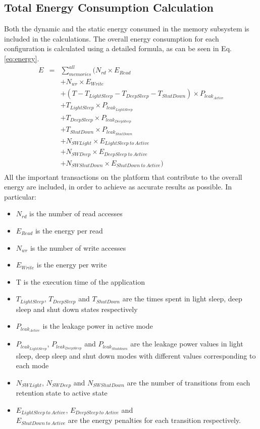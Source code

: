 \documentclass[smallcondensed]{svjour3}
\begin{document}
\subsection{Total Energy Consumption Calculation}
Both the dynamic and the static energy consumed in the memory subsystem is included in the calculations.
The overall energy consumption for each configuration is calculated using a detailed formula, as can be seen in Eq.\ref{eq:energy}. 
\setlength{\arraycolsep}{0.0em}
\begin{eqnarray}
\label{eq:energy}
 E &{}= {}&\sum\limits_{memories}^{all}  ( N_{rd} \times E_{Read} \nonumber\\
		&&+ N_{wr} \times E_{Write} \nonumber\\
		&&+ (T - T_{LightSleep} - T_{DeepSleep} - T_{ShutDown}) \times P_{leak_{Active}} \nonumber\\
		&&+ T_{LightSleep} \times P_{leak_{LightSleep}} \nonumber\\
		&&+ T_{DeepSleep} \times P_{leak_{DeepSleep}} \nonumber\\
		&&+ T_{ShutDown} \times P_{leak_{ShutDown}} \nonumber\\ 
		&& + N_{SWLight} \times E_{LightSleep \: to \: Active} \nonumber\\
		&& + N_{SWDeep} \times E_{DeepSleep \: to \: Active} \nonumber\\
		&& + N_{SWShutDown} \times E_{ShutDown \: to \: Active} ) \nonumber\\
\end{eqnarray}
\setlength{\arraycolsep}{5pt}
All the important transactions on the platform that contribute to the overall energy are included, in order to achieve as accurate results as possible. In particular:
\begin{itemize}
\item $N_{rd}$ is the number of read accesses
\item $E_{Read}$ is the energy per read
\item $N_{wr}$ is the number of write accesses 
\item $E_{Write}$ is the energy per write 
\item T is the execution time of the application
\item $T_{LightSleep}$, $T_{DeepSleep}$ and $T_{ShutDown}$ are the times spent in light sleep, deep sleep and shut down states respectively
\item $P_{leak_{Active}}$ is the leakage power in active mode 
\item $P_{leak_{LightSleep}}$, $P_{leak_{DeepSleep}}$ and $P_{leak_{Shutdown}}$ are the leakage power values in light sleep, deep sleep and shut down modes with different values corresponding to each mode 
\item $N_{SWLight}$, $N_{SWDeep}$ and $N_{SWShutDown}$ are the number of transitions from each retention state to active state
\item $E_{LightSleep \: to \: Active}$, $E_{DeepSleep \: to \: Active}$ and \\ $E_{ShutDown \: to \: Active}$  are the energy penalties for each transition respectively.
\end{itemize}
\end{document}
